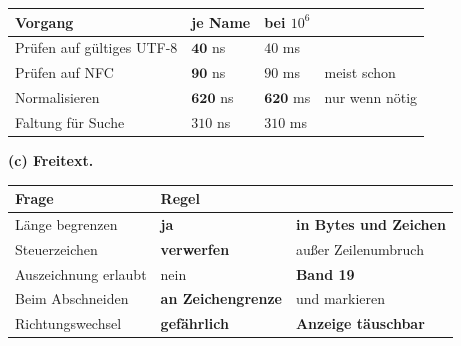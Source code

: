 \begin{aufgabe}
\begin{center}
\renewcommand{\arraystretch}{1.45}
\begin{tabular}{@{}P{3.0cm}P{2.2cm}P{2.4cm}P{1.6cm}@{}}
\toprule
\textbf{Vorgang} & \textbf{je Name} & \textbf{bei $10^6$} & \\
\midrule
Prüfen auf gültiges UTF-8 & $\mathbf{40}$ ns & $40$ ms & \\
Prüfen auf NFC & $\mathbf{90}$ ns & $90$ ms & \textcolor{gruen}{meist schon}\\
Normalisieren & $\mathbf{620}$ ns & $\mathbf{620}$ ms & \textcolor{akzent}{nur wenn nötig}\\
Faltung für Suche & $310$ ns & $310$ ms & \\
\bottomrule
\end{tabular}
\end{center}

\begin{center}
\begin{minipage}{0.88\textwidth}
\end{minipage}
\end{center}

\begin{center}
\end{center}

\medskip
\textbf{(c) Freitext.}

\begin{center}
{\small
\renewcommand{\arraystretch}{1.5}
\begin{tabular}{@{}P{3.0cm}P{2.4cm}P{2.6cm}@{}}
\toprule
\textbf{Frage} & \textbf{Regel} & \\
\midrule
Länge begrenzen & \textcolor{gruen}{\textbf{ja}} & \textbf{in Bytes und Zeichen}\\
Steuerzeichen & \textcolor{akzent}{\textbf{verwerfen}} & \textcolor{akzent}{außer Zeilenumbruch}\\
Auszeichnung erlaubt & \textcolor{akzent}{nein} & \textcolor{akzent}{\textbf{Band 19}}\\
Beim Abschneiden & \textbf{an Zeichengrenze} & \textcolor{gruen}{und markieren}\\
Richtungswechsel & \textcolor{akzent}{\textbf{gefährlich}} & \textcolor{akzent}{\textbf{Anzeige täuschbar}}\\
\bottomrule
\end{tabular}}
\end{center}


\end{aufgabe}
